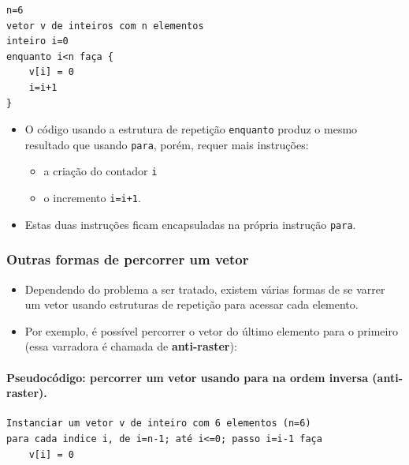 \documentclass[12pt,a4paper]{article}
\providecommand{\tightlist}{%
      \setlength{\itemsep}{0pt}\setlength{\parskip}{0pt}}
\begin{document}
    \begin{verbatim}
n=6
vetor v de inteiros com n elementos
inteiro i=0
enquanto i<n faça {
    v[i] = 0
    i=i+1
}
\end{verbatim}

    \begin{itemize}
\tightlist
\item
  O código usando a estrutura de repetição \texttt{enquanto} produz o
  mesmo resultado que usando \texttt{para}, porém, requer mais
  instruções:

  \begin{itemize}
  \tightlist
  \item
    a criação do contador \texttt{i}
  \item
    o incremento \texttt{i=i+1}.
  \end{itemize}
\item
  Estas duas instruções ficam encapsuladas na própria instrução
  \texttt{para}.
\end{itemize}

    \hypertarget{outras-formas-de-percorrer-um-vetor}{%
\subsubsection{Outras formas de percorrer um
vetor}\label{outras-formas-de-percorrer-um-vetor}}

    \begin{itemize}
\tightlist
\item
  Dependendo do problema a ser tratado, existem várias formas de se
  varrer um vetor usando estruturas de repetição para acessar cada
  elemento.
\item
  Por exemplo, é possível percorrer o vetor do último elemento para o
  primeiro (essa varradora é chamada de \textbf{anti-raster}):
\end{itemize}

    \hypertarget{pseudocuxf3digo-percorrer-um-vetor-usando-para-na-ordem-inversa-anti-raster.}{%
\paragraph{\texorpdfstring{Pseudocódigo: percorrer um vetor usando para
na ordem inversa
(\textbf{anti-raster}).}{Pseudocódigo: percorrer um vetor usando para na ordem inversa (anti-raster).}}\label{pseudocuxf3digo-percorrer-um-vetor-usando-para-na-ordem-inversa-anti-raster.}}

    \begin{verbatim}
Instanciar um vetor v de inteiro com 6 elementos (n=6)
para cada indice i, de i=n-1; até i<=0; passo i=i-1 faça
    v[i] = 0
\end{verbatim}
\end{document}
